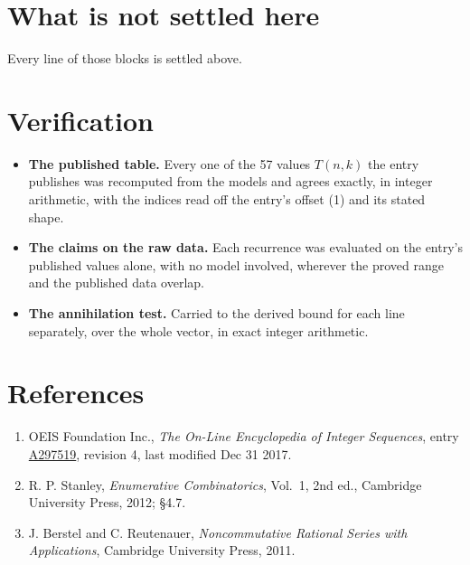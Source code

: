 \documentclass[11pt]{article}
\theoremstyle{definition}
\begin{document}
\section{What is not settled here}

Every line of those blocks is settled above.

\section{Verification}

\begin{itemize}

\item {\bfseries The published table.} Every one of the 57 values $T(n,k)$ the entry publishes was recomputed from the models and agrees exactly, in integer arithmetic, with the indices read off the entry's offset (1) and its stated shape.

\item {\bfseries The claims on the raw data.} Each recurrence was evaluated on the entry's published values alone, with no model involved, wherever the proved range and the published data overlap.

\item {\bfseries The annihilation test.} Carried to the derived bound for each line separately, over the whole vector, in exact integer arithmetic.

\end{itemize}

\section{References}

\begin{enumerate}

\item OEIS Foundation Inc., \emph{The On-Line Encyclopedia of Integer Sequences}, entry \href{https://oeis.org/A297519}{A297519}, revision 4, last modified Dec 31 2017.

\item R. P. Stanley, \emph{Enumerative Combinatorics}, Vol.~1, 2nd ed., Cambridge University Press, 2012; \S4.7.

\item J. Berstel and C. Reutenauer, \emph{Noncommutative Rational Series with Applications}, Cambridge University Press, 2011.

\end{enumerate}
\end{document}
